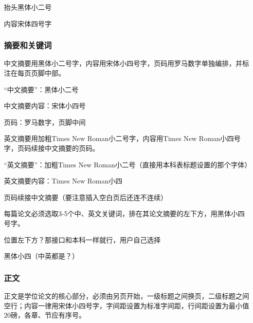 \begin{points}
  \item 抬头黑体小二号
  \item 内容宋体四号字
\end{points}


\subsubsection{摘要和关键词}

\begin{reference}
  中文摘要用黑体小二号字，内容用宋体小四号字，页码用罗马数字单独编排，并标注在每页页脚中部。
\end{reference}

\begin{points}
  \item “中文摘要”：黑体小二号
  \item 中文摘要内容：宋体小四号
  \item 页码：罗马数字，页脚中间
\end{points}

\begin{reference}
  英文摘要用加粗Times New Roman小二号字，内容用Times New Roman小四号字，页码续接中文摘要的页码。
\end{reference}

\begin{points}
  \item “英文摘要”：加粗Times New Roman小二号（直接用本科表标题设置的那个字体）
  \item 英文摘要内容：Times New Roman小四
  \item 页码续接中文摘要（要注意插入空白页后还连不连续）
\end{points}

\begin{reference}
  每篇论文必须选取3-5个中、英文关键词，排在其论文摘要的左下方，用黑体小四号字。
\end{reference}

\begin{points}
  \item 位置左下方？那接口和本科一样就行，用户自己选择
  \item 黑体小四（中英都是？）
\end{points}


\subsubsection{正文}

\begin{reference}
  正文是学位论文的核心部分，必须由另页开始，一级标题之间换页，二级标题之间空行；内容一律用宋体小四号字，字间距设置为标准字间距，行间距设置为最小值20磅，各章、节应有序号。
\end{reference}

